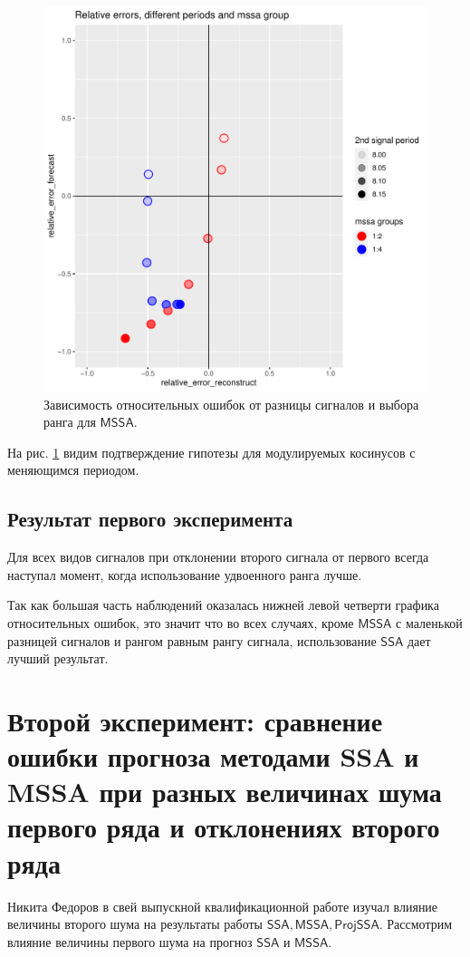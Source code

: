\documentclass[specialist, substylefile = spbureport.rtx,
    subf,href,colorlinks=true, 12pt]{disser}
\newcommand{\SSA}{\mathsf{SSA}}
\newcommand{\MSSA}{\mathsf{MSSA}}
\newcommand{\ProjSSA}{\mathsf{ProjSSA}}
\begin{document}
        \begin{figure}[h]
            \centering
            \includegraphics[width=\textwidth]{experiment_1_expcos2.pdf}
            \caption{Зависимость относительных ошибок от разницы сигналов и выбора ранга для $\MSSA$.}
            \label{fig:exp1_expcos2}
        \end{figure}

        На рис. \ref{fig:exp1_expcos2} видим подтверждение гипотезы для модулируемых косинусов с меняющимся периодом.

    \subsection{Результат первого эксперимента}

        Для всех видов сигналов при отклонении второго сигнала от первого всегда наступал момент, когда использование удвоенного ранга лучше.

        Так как большая часть наблюдений оказалась нижней левой четверти графика относительных ошибок, это значит что во всех случаях, кроме $\MSSA$ с маленькой разницей сигналов и рангом равным рангу сигнала, использование $\SSA$ дает лучший результат.

    \section{Второй эксперимент: сравнение ошибки прогноза методами SSA и MSSA при разных величинах шума первого ряда и отклонениях второго ряда}
        Никита Федоров в свей выпускной квалификационной работе изучал влияние величины второго шума на результаты работы $\SSA, \MSSA, \ProjSSA$. Рассмотрим влияние величины первого шума на прогноз $\SSA$ и $\MSSA$.
\end{document}
